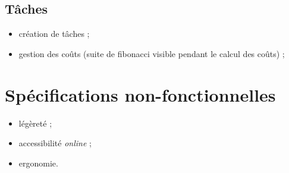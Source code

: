\subsection{T\^aches}
\begin{itemize}
\item cr\'eation de t\^aches\label{tache} ;
\item gestion des co\^uts (suite de fibonacci visible pendant le calcul des co\^uts) ;
\end{itemize}


\section{Sp\'ecifications non-fonctionnelles}
\begin{itemize}
\item l\'eg\`eret\'e ;
\item accessibilit\'e \textit{online} ;
\item ergonomie.
\end{itemize}